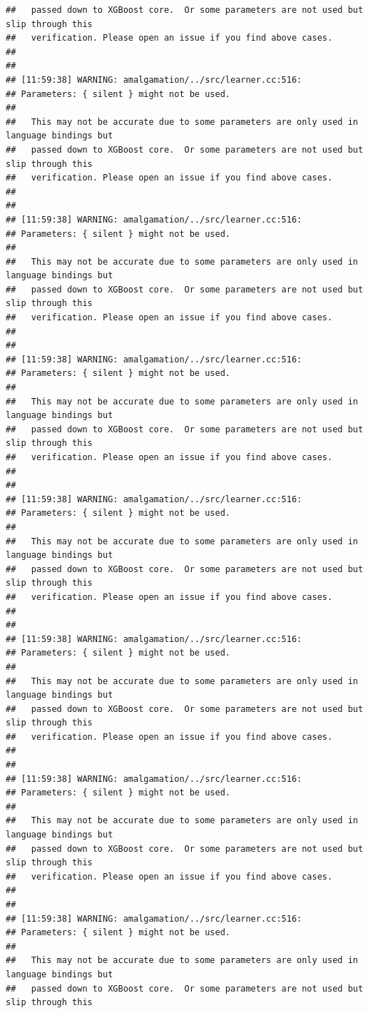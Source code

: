 \documentclass[AMS,STIX2COL]{WileyNJD-v2}\usepackage[]{graphicx}\usepackage[]{color}
\makeatletter
\newenvironment{kframe}{%
 \def\at@end@of@kframe{}%
 \ifinner\ifhmode%
  \def\at@end@of@kframe{\end{minipage}}%
  \begin{minipage}{\columnwidth}%
 \fi\fi%
 \def\FrameCommand##1{\hskip\@totalleftmargin \hskip-\fboxsep
 \colorbox{shadecolor}{##1}\hskip-\fboxsep
     \hskip-\linewidth \hskip-\@totalleftmargin \hskip\columnwidth}%
 \MakeFramed {\advance\hsize-\width
   \@totalleftmargin\z@ \linewidth\hsize
   \@setminipage}}%
 {\par\unskip\endMakeFramed%
 \at@end@of@kframe}
\newenvironment{knitrout}{}{} %
\makeatother
\begin{document}
\begin{knitrout}
\begin{kframe}
\begin{verbatim}
##   passed down to XGBoost core.  Or some parameters are not used but slip through this
##   verification. Please open an issue if you find above cases.
## 
## 
## [11:59:38] WARNING: amalgamation/../src/learner.cc:516: 
## Parameters: { silent } might not be used.
## 
##   This may not be accurate due to some parameters are only used in language bindings but
##   passed down to XGBoost core.  Or some parameters are not used but slip through this
##   verification. Please open an issue if you find above cases.
## 
## 
## [11:59:38] WARNING: amalgamation/../src/learner.cc:516: 
## Parameters: { silent } might not be used.
## 
##   This may not be accurate due to some parameters are only used in language bindings but
##   passed down to XGBoost core.  Or some parameters are not used but slip through this
##   verification. Please open an issue if you find above cases.
## 
## 
## [11:59:38] WARNING: amalgamation/../src/learner.cc:516: 
## Parameters: { silent } might not be used.
## 
##   This may not be accurate due to some parameters are only used in language bindings but
##   passed down to XGBoost core.  Or some parameters are not used but slip through this
##   verification. Please open an issue if you find above cases.
## 
## 
## [11:59:38] WARNING: amalgamation/../src/learner.cc:516: 
## Parameters: { silent } might not be used.
## 
##   This may not be accurate due to some parameters are only used in language bindings but
##   passed down to XGBoost core.  Or some parameters are not used but slip through this
##   verification. Please open an issue if you find above cases.
## 
## 
## [11:59:38] WARNING: amalgamation/../src/learner.cc:516: 
## Parameters: { silent } might not be used.
## 
##   This may not be accurate due to some parameters are only used in language bindings but
##   passed down to XGBoost core.  Or some parameters are not used but slip through this
##   verification. Please open an issue if you find above cases.
## 
## 
## [11:59:38] WARNING: amalgamation/../src/learner.cc:516: 
## Parameters: { silent } might not be used.
## 
##   This may not be accurate due to some parameters are only used in language bindings but
##   passed down to XGBoost core.  Or some parameters are not used but slip through this
##   verification. Please open an issue if you find above cases.
## 
## 
## [11:59:38] WARNING: amalgamation/../src/learner.cc:516: 
## Parameters: { silent } might not be used.
## 
##   This may not be accurate due to some parameters are only used in language bindings but
##   passed down to XGBoost core.  Or some parameters are not used but slip through this

\end{verbatim}
\end{kframe}
\end{knitrout}
\end{document}
